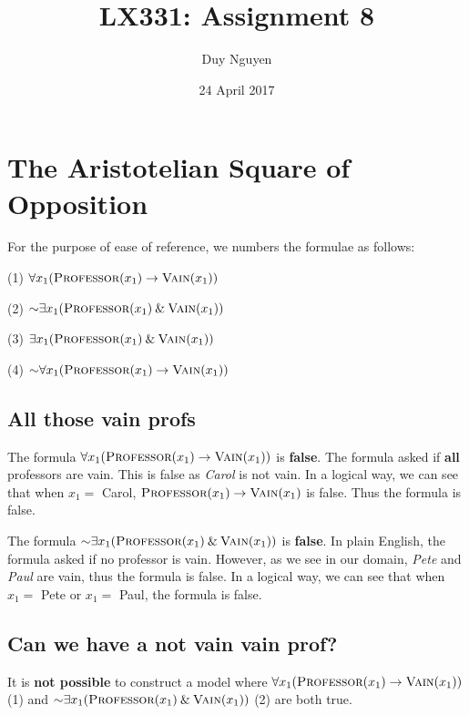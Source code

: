 \documentclass{article}
\title{LX331: Assignment 8}
\author{Duy Nguyen}
\date{24 April 2017}
\begin{document}
\maketitle
\newcommand*{\msim}{\mathord{\sim}}
\newcommand*{\mand}{\mathbin{\&}}
\newcommand*{\mtab}{\hspace*{1cm}}

\section{The Aristotelian Square of Opposition}
For the purpose of ease of reference, we numbers the formulae as follows:

\mtab (1) $\forall x_1 (\textsc{Professor}(x_1)\rightarrow \textsc{Vain}(x_1))$

\mtab (2) $\msim \exists x_1 (\textsc{Professor}(x_1)\mand \textsc{Vain}(x_1))$

\mtab (3) $\exists x_1 (\textsc{Professor}(x_1)\mand \textsc{Vain}(x_1))$

\mtab (4) $\msim \forall x_1 (\textsc{Professor}(x_1)\rightarrow \textsc{Vain}(x_1))$

 
\subsection{All those vain profs}
The formula $\forall x_1 (\textsc{Professor}(x_1)\rightarrow \textsc{Vain}(x_1))$ is \textbf{false}. The formula asked if \textbf{all} professors are vain. This is false as \textit{Carol} is not vain. In a logical way, we can see that when $x_1 = $ Carol, $\textsc{Professor}(x_1)\rightarrow \textsc{Vain}(x_1)$ is false. Thus the formula is false.

The formula $\msim \exists x_1 (\textsc{Professor}(x_1)\mand \textsc{Vain}(x_1))$ is \textbf{false}. In plain English, the formula asked if no professor is vain. However, as we see in our domain, \textit{Pete} and \textit{Paul} are vain, thus the formula is false. In a logical way, we can see that when $x_1 = $ Pete or $x_1 = $ Paul, the formula is false. 

\subsection{Can we have a not vain vain prof?}

It is \textbf{not possible} to construct a model where $\forall x_1 (\textsc{Professor}(x_1)\rightarrow \textsc{Vain}(x_1))$ (1) and $\msim \exists x_1 (\textsc{Professor}(x_1)\mand \textsc{Vain}(x_1))$ (2) are both true. 
\end{document}
